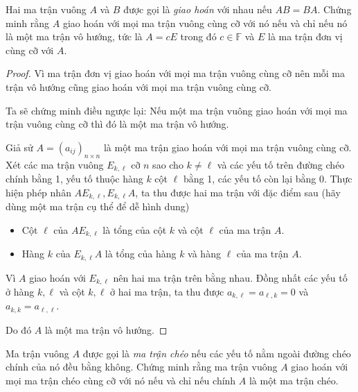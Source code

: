 \begin{exercise}
    Hai ma trận vuông $A$ và $B$ được gọi là \textit{giao hoán} với nhau nếu $AB = BA$. Chứng minh rằng $A$ giao hoán với mọi ma trận vuông cùng cỡ với nó nếu và chỉ nếu nó là một ma trận vô hướng, tức là $A = cE$ trong đó $c\in\mathbb{F}$ và $E$ là ma trận đơn vị cùng cỡ với $A$.
\end{exercise}

\begin{proof}
    Vì ma trận đơn vị giao hoán với mọi ma trận vuông cùng cỡ nên mỗi ma trận vô hướng cũng giao hoán với mọi ma trận vuông cùng cỡ.

    Ta sẽ chứng minh điều ngược lại: Nếu một ma trận vuông giao hoán với mọi ma trận vuông cùng cỡ thì đó là một ma trận vô hướng.

    Giả sử $A = {(a_{ij})}_{n\times n}$ là một ma trận giao hoán với mọi ma trận vuông cùng cỡ. Xét các ma trận vuông $E_{k,\ell}$ cỡ $n$ sao cho $k\ne \ell$ và các yếu tố trên đường chéo chính bằng 1, yếu tố thuộc hàng $k$ cột $\ell$ bằng 1, các yếu tố còn lại bằng 0. Thực hiện phép nhân $AE_{k,\ell}, E_{k,\ell}A$, ta thu được hai ma trận với đặc điểm sau (hãy dùng một ma trận cụ thể để dễ hình dung)
    \begin{itemize}
        \item Cột $\ell$ của $AE_{k,\ell}$ là tổng của cột $k$ và cột $\ell$ của ma trận $A$.
        \item Hàng $k$ của $E_{k,\ell}A$ là tổng của hàng $k$ và hàng $\ell$ của ma trận $A$.
    \end{itemize}

    Vì $A$ giao hoán với $E_{k,\ell}$ nên hai ma trận trên bằng nhau. Đồng nhất các yếu tố ở hàng $k, \ell$ và cột $k, \ell$ ở hai ma trận, ta thu được $a_{k,\ell} = a_{\ell,k} = 0$ và $a_{k,k} = a_{\ell,\ell}$.

    Do đó $A$ là một ma trận vô hướng.
\end{proof}

\begin{exercise}
    Ma trận vuông $A$ được gọi là \textit{ma trận chéo} nếu các yếu tố nằm ngoài đường chéo chính của nó đều bằng không. Chứng minh rằng ma trận vuông $A$ giao hoán với mọi ma trận chéo cùng cỡ với nó nếu và chỉ nếu chính $A$ là một ma trận chéo.
\end{exercise}

